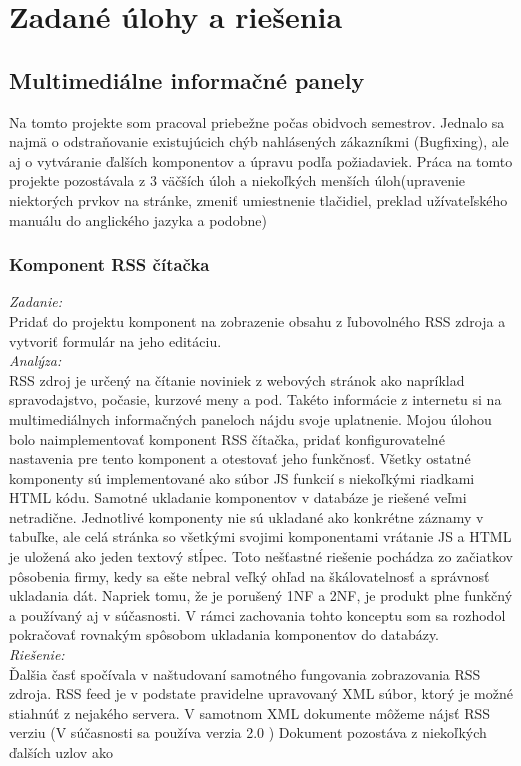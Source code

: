 \documentclass[11pt, oneside]{report}
\begin{document}
\chapter{Zadané úlohy a riešenia}
\section{Multimediálne informačné panely}
Na tomto projekte som pracoval  priebežne počas  obidvoch semestrov. Jednalo sa najmä o  odstraňovanie existujúcich chýb nahlásených zákazníkmi (Bugfixing), ale aj o vytváranie ďalších komponentov a úpravu podľa požiadaviek. Práca na tomto projekte pozostávala z 3 väčších úloh  a  niekoľkých menších úloh(upravenie niektorých prvkov na stránke, zmeniť umiestnenie tlačidiel, preklad užívateľského manuálu do anglického jazyka a podobne)
\subsection{Komponent RSS čítačka}
\textit{Zadanie:}\\
Pridať do projektu  komponent na zobrazenie obsahu z ľubovolného RSS zdroja a vytvoriť formulár na jeho editáciu.
\\\textit{Analýza:}\\
 RSS zdroj   je určený na čítanie noviniek  z webových stránok ako napríklad spravodajstvo, počasie, kurzové meny a pod. Takéto informácie  z internetu si na multimediálnych informačných paneloch nájdu svoje uplatnenie. Mojou úlohou bolo naimplementovať komponent RSS čítačka, pridať  konfigurovatelné nastavenia pre tento komponent a otestovať jeho funkčnosť.
Všetky ostatné komponenty sú implementované ako súbor JS funkcií s niekoľkými riadkami HTML kódu. Samotné ukladanie komponentov v databáze je riešené veľmi netradične. Jednotlivé komponenty nie sú ukladané ako konkrétne záznamy v tabuľke, ale celá stránka  so všetkými svojimi komponentami vrátanie JS a HTML je uložená ako jeden textový stĺpec. Toto nešťastné riešenie  pochádza  zo začiatkov pôsobenia firmy, kedy sa ešte nebral veľký ohľad na  škálovatelnosť a  správnosť ukladania dát. 
Napriek tomu, že je porušený 1NF a 2NF, je produkt plne funkčný a používaný aj v súčasnosti. V rámci zachovania tohto konceptu som sa rozhodol pokračovať rovnakým spôsobom ukladania komponentov do databázy.
\\\textit{Riešenie:}\\
Ďalšia časť spočívala v naštudovaní samotného fungovania zobrazovania RSS zdroja. RSS feed je v podstate pravidelne upravovaný XML súbor, ktorý je možné stiahnúť z nejakého servera. V samotnom XML dokumente môžeme nájsť RSS verziu (V súčasnosti sa používa verzia 2.0 ) Dokument pozostáva z niekoľkých ďalších uzlov ako \lstset{language=XML}
\end{document}
